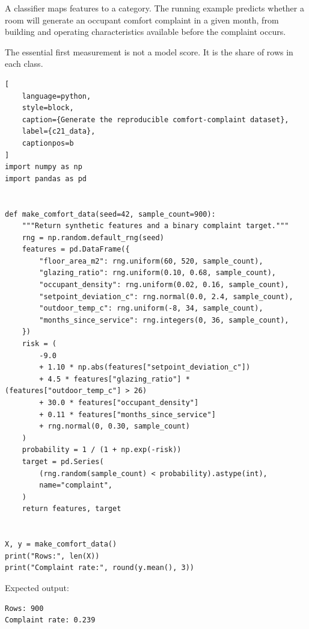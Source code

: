 
A classifier maps features to a category. The running example predicts whether a
room will generate an occupant comfort complaint in a given month, from
building and operating characteristics available before the complaint occurs.

The essential first measurement is not a model score. It is the share of rows in
each class.

\begin{lstlisting}[
    language=python,
    style=block,
    caption={Generate the reproducible comfort-complaint dataset},
    label={c21_data},
    captionpos=b
]
import numpy as np
import pandas as pd


def make_comfort_data(seed=42, sample_count=900):
    """Return synthetic features and a binary complaint target."""
    rng = np.random.default_rng(seed)
    features = pd.DataFrame({
        "floor_area_m2": rng.uniform(60, 520, sample_count),
        "glazing_ratio": rng.uniform(0.10, 0.68, sample_count),
        "occupant_density": rng.uniform(0.02, 0.16, sample_count),
        "setpoint_deviation_c": rng.normal(0.0, 2.4, sample_count),
        "outdoor_temp_c": rng.uniform(-8, 34, sample_count),
        "months_since_service": rng.integers(0, 36, sample_count),
    })
    risk = (
        -9.0
        + 1.10 * np.abs(features["setpoint_deviation_c"])
        + 4.5 * features["glazing_ratio"] * (features["outdoor_temp_c"] > 26)
        + 30.0 * features["occupant_density"]
        + 0.11 * features["months_since_service"]
        + rng.normal(0, 0.30, sample_count)
    )
    probability = 1 / (1 + np.exp(-risk))
    target = pd.Series(
        (rng.random(sample_count) < probability).astype(int),
        name="complaint",
    )
    return features, target


X, y = make_comfort_data()
print("Rows:", len(X))
print("Complaint rate:", round(y.mean(), 3))
\end{lstlisting}

Expected output:

\begin{lstlisting}[language=text, style=block, caption={An imbalanced target}, label={c21_data_output}, captionpos=b]
Rows: 900
Complaint rate: 0.239
\end{lstlisting}

